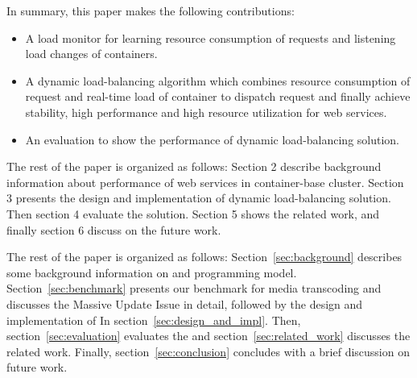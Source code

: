 In summary, this paper makes the following contributions:

\begin{itemize}

\item A load monitor for learning resource consumption of requests and listening load changes of containers.

  \item A dynamic load-balancing algorithm which combines resource consumption of request and real-time load of container to dispatch request and finally achieve stability, high performance and high resource utilization for web services.

  \item An evaluation to show the performance of dynamic load-balancing solution.


\end{itemize}
The rest of the paper is organized as follows: Section 2 describe background information about performance of web services in container-base cluster. Section 3 presents the design and implementation of dynamic load-balancing solution. Then section 4 evaluate the solution. Section 5 shows the related work, and finally section 6 discuss on the future work.

The rest of the paper is organized as follows: Section~\ref{sec:background} describes some background information 
on \gvirt{} and \gpu{} programming model. Section~\ref{sec:benchmark} presents our benchmark for media transcoding 
and discusses the Massive Update Issue in detail, followed by the design and implementation of \name{} 
 In section~\ref{sec:design_and_impl}. Then, section~\ref{sec:evaluation} evaluates the \name{} and
 section~\ref{sec:related_work} discusses the related work. Finally, section~\ref{sec:conclusion} concludes with
 a brief discussion on future work. 
